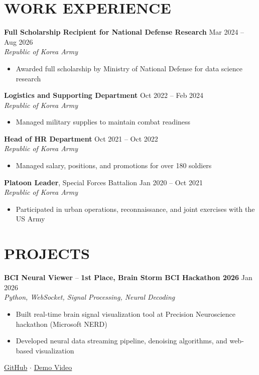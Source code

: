 \documentclass[11pt,a4paper]{article}
\begin{document}
\section{WORK EXPERIENCE}

\textbf{Full Scholarship Recipient for National Defense Research} \hfill Mar 2024 -- Aug 2026\\
\textit{Republic of Korea Army}
\begin{itemize}[leftmargin=1.5em, nosep]
    \item Awarded full scholarship by Ministry of National Defense for data science research
\end{itemize}

\textbf{Logistics and Supporting Department} \hfill Oct 2022 -- Feb 2024\\
\textit{Republic of Korea Army}
\begin{itemize}[leftmargin=1.5em, nosep]
    \item Managed military supplies to maintain combat readiness
\end{itemize}

\textbf{Head of HR Department} \hfill Oct 2021 -- Oct 2022\\
\textit{Republic of Korea Army}
\begin{itemize}[leftmargin=1.5em, nosep]
    \item Managed salary, positions, and promotions for over 180 soldiers
\end{itemize}

\textbf{Platoon Leader}, Special Forces Battalion \hfill Jan 2020 -- Oct 2021\\
\textit{Republic of Korea Army}
\begin{itemize}[leftmargin=1.5em, nosep]
    \item Participated in urban operations, reconnaissance, and joint exercises with the US Army
\end{itemize}

\section{PROJECTS}

\textbf{BCI Neural Viewer} -- \textbf{1st Place, Brain Storm BCI Hackathon 2026} \hfill Jan 2026\\
\textit{Python, WebSocket, Signal Processing, Neural Decoding}
\begin{itemize}[leftmargin=1.5em, nosep]
    \item Built real-time brain signal visualization tool at Precision Neuroscience hackathon (Microsoft NERD)
    \item Developed neural data streaming pipeline, denoising algorithms, and web-based visualization
\end{itemize}
\href{https://github.com/son-engr-kr/H2W-brainstorm-track2}{GitHub} $\cdot$ \href{https://www.youtube.com/watch?v=VwRhRfCjqCM}{Demo Video}
\end{document}
